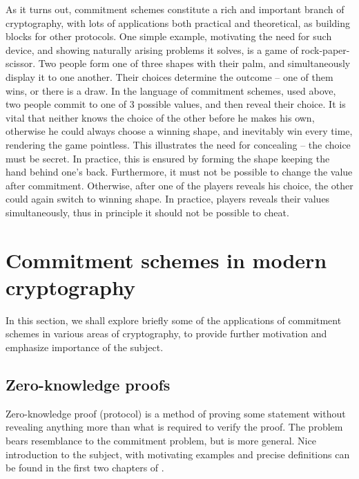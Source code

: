 \documentclass[10pt]{article}
\begin{document}
As it turns out, commitment schemes constitute a rich and important branch of cryptography, with lots of
applications both practical and theoretical, as building blocks for other protocols. One simple example,
motivating the need for such device, and showing naturally arising problems it solves, is a game of 
rock-paper-scissor. Two people form one of three shapes with their palm, and simultaneously display it
to one another. Their choices determine the outcome -- one of them wins, or there is a draw. In the
language of commitment schemes, used above, two people commit to one of 3 possible values, and then reveal
their choice. It is vital that neither knows the choice of the other before he makes his own, otherwise
he could always choose a winning shape, and inevitably win every time, rendering the game pointless.
This illustrates the need for concealing -- the choice must be secret. In practice, this is ensured
by forming the shape keeping the hand behind one's back. Furthermore, it must not be possible to change
the value after commitment. Otherwise, after one of the players reveals his choice, the other could again
switch to winning shape. In practice, players reveals their values simultaneously, thus in principle it
should not be possible to cheat.\footnotemark



\section{Commitment schemes in modern cryptography}

In this section, we shall explore briefly some of the applications of commitment schemes in various
areas of cryptography, to provide further motivation and emphasize importance of the subject.

\subsection{Zero-knowledge proofs}

Zero-knowledge proof (protocol) is a method of proving some statement without revealing anything more
than what is required to verify the proof. The problem bears resemblance to the commitment problem, but
is more general. Nice introduction to the subject, with motivating examples and precise definitions can
be found in the first two chapters of \cite{MIT:StatZero}. 
\end{document}
